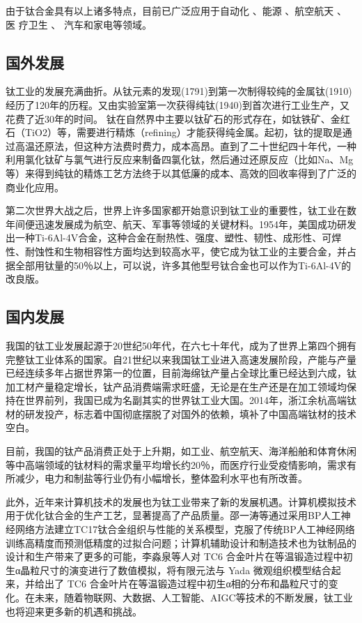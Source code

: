 由于钛合金具有以上诸多特点，目前已广泛应用于自动化 、能源 、航空航天 、 医	疗卫生 、 汽车和家电等领域。
\subsection{国外发展}
钛工业的发展充满曲折。从钛元素的发现(1791)到第一次制得较纯的金属钛(1910)经历了120年的历程。又由实验室第一次获得纯钛(1940)到首次进行工业生产，又花费了近30年的时间。
钛在自然界中主要以钛矿石的形式存在，如钛铁矿、金红石（TiO2）等，需要进行精炼（refining）才能获得纯金属。起初，钛的提取是通过高温还原法，但这种方法费时费力，成本高昂。直到了二十世纪四十年代，一种利用氯化钛矿与氯气进行反应来制备四氯化钛，然后通过还原反应（比如Na、Mg等）来得到纯钛的精炼工艺方法终于以其低廉的成本、高效的回收率得到了广泛的商业化应用。

第二次世界大战之后，世界上许多国家都开始意识到钛工业的重要性，钛工业在数年间便迅速发展成为航空、航天、军事等领域的关键材料。1954年，美国成功研发出一种Ti-6Al-4V合金，这种合金在耐热性、强度、塑性、韧性、成形性、可焊性、耐蚀性和生物相容性方面均达到较高水平，使它成为钛工业的主要合金，并占据全部用钛量的50％以上，可以说，许多其他型号钛合金也可以作为Ti-6Al-4V的改良版\cite{COLO200102000}。

\subsection{国内发展}
我国的钛工业发展起源于20世纪50年代，在六七十年代，成为了世界上第四个拥有完整钛工业体系的国家。自21世纪以来我国钛工业进入高速发展阶段，产能与产量已经连续多年占据世界第一的位置，目前海绵钛产量占全球比重已经达到六成，钛加工材产量稳定增长，钛产品消费端需求旺盛\cite{JSTB202209001}，无论是在生产还是在加工领域均保持在世界前列，我国已成为名副其实的世界钛工业大国。2014年，浙江余杭高端钛材的研发投产，标志着中国彻底摆脱了对国外的依赖，填补了中国高端钛材的技术空白。\cite{TGYJ200405004}

目前，我国的钛产品消费正处于上升期，如工业、航空航天、海洋船舶和体育休闲等中高端领域的钛材料的需求量平均增长约20％，而医疗行业受疫情影响，需求有所减少，电力和制盐等行业仍有小幅增长，整体盈利水平也有所改善\cite{BJKY202204004}。

此外，近年来计算机技术的发展也为钛工业带来了新的发展机遇。计算机模拟技术用于优化钛合金的生产工艺，显著提高了产品质量。邵一涛等通过采用BP人工神经网络方法建立TC17钛合金组织与性能的关系模型，克服了传统BP人工神经网络训练高精度而预测低精度的过拟合问题\cite{BP}；计算机辅助设计和制造技术也为钛制品的设计和生产带来了更多的可能，李淼泉等人对 TC6 合金叶片在等温锻造过程中初生α晶粒尺寸的演变进行了数值模拟\cite{Moni}，将有限元法与 Yada 微观组织模型结合起来，并给出了 TC6 合金叶片在等温锻造过程中初生α相的分布和晶粒尺寸的变化。在未来，随着物联网、大数据、人工智能、AIGC等技术的不断发展，钛工业也将迎来更多新的机遇和挑战。
